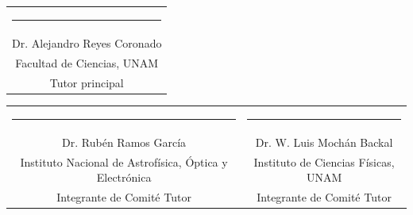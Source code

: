\documentclass[letter,11pt]{article}
\begin{document}
\vfill
\begin{center}
	\begin{tabular} { c }
		\setlength{\tabcolsep}{15pt}
		\renewcommand{\arraystretch}{1.5}
		\noindent\rule{8cm}{0.4pt} \\
		Dr. Alejandro Reyes Coronado\\
		Facultad   de Ciencias, UNAM\\
		Tutor principal\\
	\end{tabular}

\vfill


	\begin{tabular} { c c }
		\setlength{\tabcolsep}{15pt}
		\renewcommand{\arraystretch}{1.5}
		\noindent\rule{8cm}{0.4pt} & \noindent\rule{8cm}{0.4pt} \\
		 Dr. Rubén Ramos García &  Dr. W. Luis Mochán Backal\\
		 Instituto Nacional de Astrofísica, Óptica y Electrónica & Instituto de Ciencias Físicas, UNAM\\
		Integrante de Comité Tutor & Integrante de Comité Tutor
	\end{tabular}
\end{center}
\end{document}
